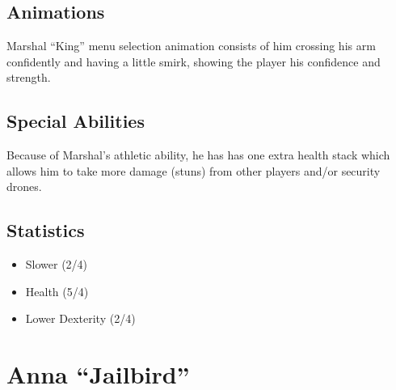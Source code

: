 \documentclass[10pt]{report}
\begin{document}
\begin{multicols}{2}
    \subsection{Animations}
    
    Marshal “King” menu selection animation consists of him crossing his arm confidently and having a little smirk, showing the player his confidence and strength.
    
    \subsection{Special Abilities}
    
    Because of Marshal’s athletic ability, he has has one extra health stack which allows him to take more damage (stuns) from other players and/or security drones.
    
    \subsection{Statistics}
    
    \begin{itemize}
        \item Slower (2/4)
        \item Health (5/4)
        \item Lower Dexterity (2/4)
    \end{itemize}
\end{multicols}
    
\pagebreak

\section{Anna ``Jailbird''}
\end{document}
